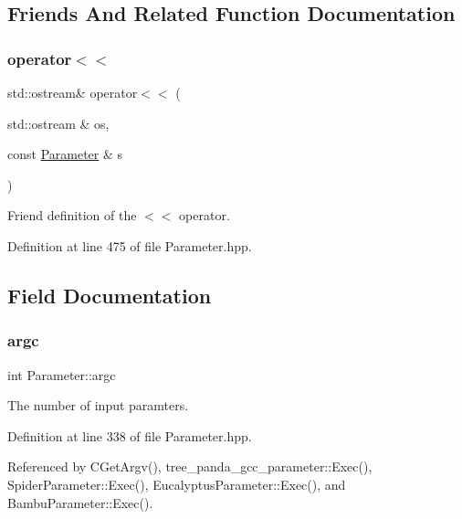 \subsection{Friends And Related Function Documentation}
\mbox{\label{classParameter_a2a570ccf35a052996bada29a8fbae6ff}} 
\subsubsection{\texorpdfstring{operator$<$$<$}{operator<<}}
{\footnotesize\ttfamily std\+::ostream\& operator$<$$<$ (\begin{DoxyParamCaption}\item[{std\+::ostream \&}]{os,  }\item[{const \hyperlink{classParameter}{Parameter} \&}]{s }\end{DoxyParamCaption})\hspace{0.3cm}{\ttfamily [friend]}}



Friend definition of the $<$$<$ operator. 



Definition at line 475 of file Parameter.\+hpp.



\subsection{Field Documentation}
\mbox{\label{classParameter_a76b21c2ed27f73883401229217020814}} 
\subsubsection{\texorpdfstring{argc}{argc}}
{\footnotesize\ttfamily int Parameter\+::argc\hspace{0.3cm}{\ttfamily [protected]}}



The number of input paramters. 



Definition at line 338 of file Parameter.\+hpp.



Referenced by C\+Get\+Argv(), tree\+\_\+panda\+\_\+gcc\+\_\+parameter\+::\+Exec(), Spider\+Parameter\+::\+Exec(), Eucalyptus\+Parameter\+::\+Exec(), and Bambu\+Parameter\+::\+Exec().

